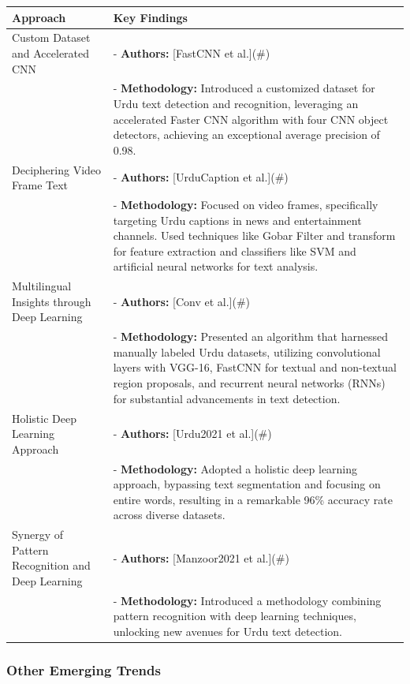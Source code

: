 \documentclass[default,iicol]{sn-jnl}%
\begin{document}
\begin{center}
	\begin{tabular}{|p{3cm}|p{6cm}|}
		\hline
		\textbf{Approach} & \textbf{Key Findings} \\
		\hline
		Custom Dataset and Accelerated CNN & 
		- \textbf{Authors:} [FastCNN et al.](\#) \\
		& - \textbf{Methodology:} Introduced a customized dataset for Urdu text detection and recognition, leveraging an accelerated Faster CNN algorithm with four CNN object detectors, achieving an exceptional average precision of 0.98. \\
		\hline
		Deciphering Video Frame Text & 
		- \textbf{Authors:} [UrduCaption et al.](\#) \\
		& - \textbf{Methodology:} Focused on video frames, specifically targeting Urdu captions in news and entertainment channels. Used techniques like Gobar Filter and transform for feature extraction and classifiers like SVM and artificial neural networks for text analysis. \\
		\hline
		Multilingual Insights through Deep Learning & 
		- \textbf{Authors:} [Conv et al.](\#) \\
		& - \textbf{Methodology:} Presented an algorithm that harnessed manually labeled Urdu datasets, utilizing convolutional layers with VGG-16, FastCNN for textual and non-textual region proposals, and recurrent neural networks (RNNs) for substantial advancements in text detection. \\
		\hline
		Holistic Deep Learning Approach & 
		- \textbf{Authors:} [Urdu2021 et al.](\#) \\
		& - \textbf{Methodology:} Adopted a holistic deep learning approach, bypassing text segmentation and focusing on entire words, resulting in a remarkable 96\% accuracy rate across diverse datasets. \\
		\hline
		Synergy of Pattern Recognition and Deep Learning & 
		- \textbf{Authors:} [Manzoor2021 et al.](\#) \\
		& - \textbf{Methodology:} Introduced a methodology combining pattern recognition with deep learning techniques, unlocking new avenues for Urdu text detection. \\
		\hline
	\end{tabular}
\end{center}

\subsubsection{Other Emerging Trends}
\end{document}
